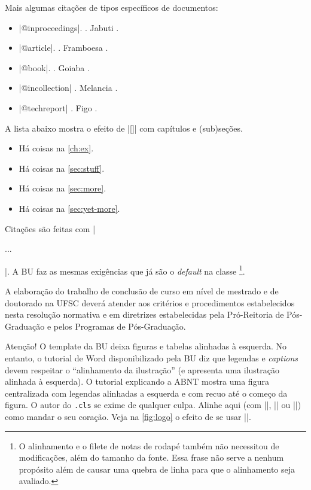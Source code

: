 \documentclass[embeddedlogo]{../ufsc-thesis-rn46-2019}
\begin{document}
Mais algumas citações de tipos específicos de documentos:
\begin{itemize}
\item \mt|@inproceedings|. . Jabuti
  \cite{Ullman1989magic}.
\item \mt|@article|. . Framboesa \cite{Distefano2019}.
\item \mt|@book|. . Goiaba \cite{Abiteboul1995}.
\item \mt|@incollection| . Melancia \cite{Forgy1989}.
\item \mt|@techreport| . Figo \cite{rdf11}.
\end{itemize}

A lista abaixo mostra o efeito de \mt|\autoref{}| com capítulos e (sub)seções.

\begin{itemize}
\item Há coisas na \autoref{ch:ex}.
\item Há coisas na \autoref{sec:stuff}.
\item Há coisas na \autoref{sec:more}.
\item Há coisas na \autoref{sec:yet-more}.
\end{itemize}

Citações são feitas com \mt|\begin{citacao}...\end{citacao}|. A BU faz
as mesmas exigências que já são o \textit{default} na classe
\footnote{O alinhamento e o filete de notas de rodapé também
não necessitou de modificações, além do tamanho da fonte. Essa frase
não serve a nenhum propósito além de causar uma quebra de linha para
que o alinhamento seja avaliado.}.

\begin{citacao}
  A elaboração do trabalho de conclusão de curso em nível de mestrado
  e de doutorado na UFSC deverá atender aos critérios e procedimentos
  estabelecidos nesta resolução normativa e em diretrizes
  estabelecidas pela Pró-Reitoria de Pós-Graduação e pelos Programas
  de Pós-Graduação.
\end{citacao}

Atenção! O template da BU deixa figuras e tabelas alinhadas à esquerda. No
entanto, o tutorial de Word disponibilizado pela BU diz que legendas e
\emph{captions} devem respeitar o ``alinhamento da ilustração'' (e apresenta
uma ilustração alinhada à esquerda). O tutorial explicando a ABNT mostra uma
figura centralizada com legendas alinhadas a esquerda e com recuo até o começo
da figura. O autor do \texttt{.cls} se exime de qualquer culpa. Alinhe aqui
(com \mt|\centering|, \mt|\flushright| ou \mt|\flushleft|) como mandar o seu
coração. Veja na \autoref{fig:logo} o efeito de se usar \mt|\centering|.
\end{document}
